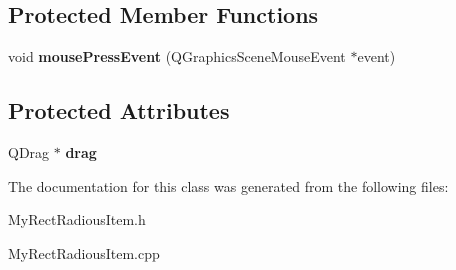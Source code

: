 \subsection*{Protected Member Functions}
\begin{DoxyCompactItemize}
\item 
\hypertarget{class_my_rect_radious_item_ad28af1823cfa410b78718837a78edb6c}{}void {\bfseries mouse\+Press\+Event} (Q\+Graphics\+Scene\+Mouse\+Event $\ast$event)\label{class_my_rect_radious_item_ad28af1823cfa410b78718837a78edb6c}

\end{DoxyCompactItemize}
\subsection*{Protected Attributes}
\begin{DoxyCompactItemize}
\item 
\hypertarget{class_my_rect_radious_item_ae3a3010697b291fc7fe1bcac243d1d99}{}Q\+Drag $\ast$ {\bfseries drag}\label{class_my_rect_radious_item_ae3a3010697b291fc7fe1bcac243d1d99}

\end{DoxyCompactItemize}


The documentation for this class was generated from the following files\+:\begin{DoxyCompactItemize}
\item 
My\+Rect\+Radious\+Item.\+h\item 
My\+Rect\+Radious\+Item.\+cpp\end{DoxyCompactItemize}

